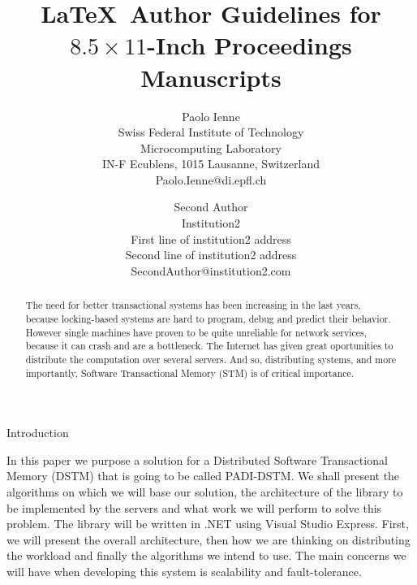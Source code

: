\documentclass[times, 10pt,twocolumn]{article}
\begin{document}
\title{\LaTeX\ Author Guidelines 
       for {\boldmath $8.5 \times 11$-Inch} Proceedings Manuscripts}

\author{Paolo Ienne\\
Swiss Federal Institute of Technology\\ Microcomputing Laboratory \\ IN-F 
Ecublens, 1015 Lausanne, Switzerland\\ Paolo.Ienne@di.epfl.ch\\
\and
Second Author\\
Institution2\\
First line of institution2 address\\ Second line of institution2 address\\ 
SecondAuthor@institution2.com\\
}

\maketitle
\thispagestyle{empty}

\begin{abstract}
   The need for better transactional systems has been increasing in the last years, because locking-based systems are hard to program, debug and predict their behavior. However single machines have proven to be quite unreliable for network services, because it can crash and are a bottleneck. The Internet has given great oportunities to distribute the computation over several servers. And so, distributing systems, and more importantly, Software Transactional Memory (STM) is of critical importance.
\end{abstract}




Introduction

In this paper we purpose a solution for a Distributed Software Transactional Memory (DSTM) that is going to be called PADI-DSTM. We shall present the algorithms on which we will base our solution, the architecture of the library to be implemented by the servers and what work we will perform to solve this problem. The library will be written in .NET using Visual Studio Express.
First, we will present the overall architecture, then how we are thinking on distributing the workload and finally the algorithms we intend to use.
The main concerns we will have when developing this system is scalability and fault-tolerance. 
\end{document}
